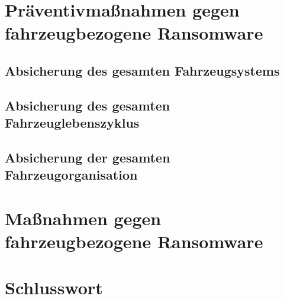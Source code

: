 \documentclass[oneside, 11pt, notitlepage, a4paper, numbers=noenddot]{scrartcl}
\begin{document}
\section{Präventivmaßnahmen gegen fahrzeugbezogene Ransomware}

\subsection{Absicherung des gesamten Fahrzeugsystems}

\subsection{Absicherung des gesamten Fahrzeuglebenszyklus}

\subsection{Absicherung der gesamten Fahrzeugorganisation}


\section{Maßnahmen gegen fahrzeugbezogene Ransomware}


\section{Schlusswort}




\end{document}
